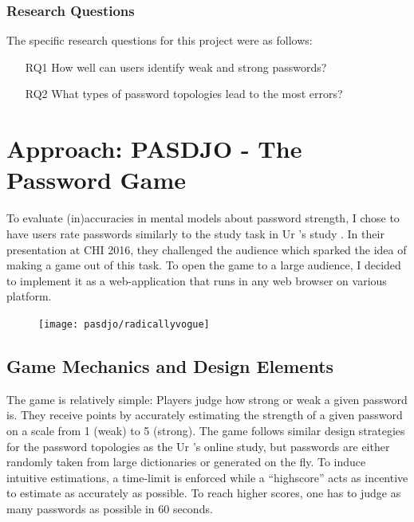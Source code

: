 \subsubsection{Research Questions}
The specific research questions for this project were as follows:
\begin{itemize}
\item[RQ1] How well can users identify weak and strong passwords?
\item[RQ2] What types of password topologies lead to the most errors?
\end{itemize}



\section{Approach: PASDJO - The Password Game}
To evaluate (in)accuracies in mental models about password strength, I chose to have users rate passwords similarly to the study task in Ur \etal's study \cite{Ur2016PerceptionsPassword}. In their presentation at CHI 2016, they challenged the audience which sparked the idea of making a game out of this task. To open the game to a large audience, I decided to implement it as a web-application that runs in any web browser on various platform. 

\begin{figure}
	\centering
	\texttt{[image: pasdjo/radicallyvogue]}
	\caption{\label{fig:pasdjo:radicallyvogue}}
\end{figure}

\subsection{Game Mechanics and Design Elements}
The game is relatively simple: Players judge how strong or weak a given password is. They receive points by accurately estimating the strength of a given password on a scale from 1 (weak) to 5 (strong). The game follows similar design strategies for the password topologies as the Ur \etal's online study, but passwords are either randomly taken from large dictionaries or generated on the fly. To induce intuitive estimations, a time-limit is enforced while a ``highscore'' acts as incentive to estimate as accurately as possible. To reach higher scores, one has to judge as many passwords as possible in 60 seconds. 

